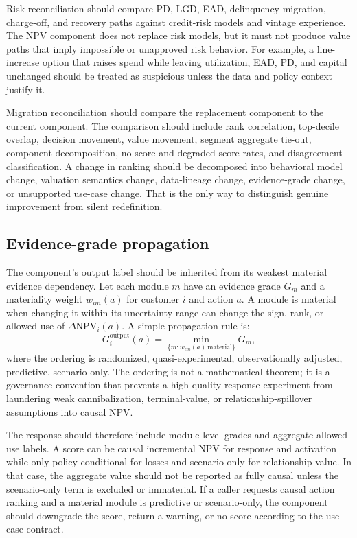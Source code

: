 \documentclass[11pt]{article}
\newcommand{\NPV}{\mathrm{NPV}}
\newcommand{\1}{\mathbf{1}}
\begin{document}
Risk reconciliation should compare PD, LGD, EAD, delinquency migration,
charge-off, and recovery paths against credit-risk models and vintage
experience. The NPV component does not replace risk models, but it must not
produce value paths that imply impossible or unapproved risk behavior. For
example, a line-increase option that raises spend while leaving utilization,
EAD, PD, and capital unchanged should be treated as suspicious unless the data
and policy context justify it.

Migration reconciliation should compare the replacement component to the
current component. The comparison should include rank correlation,
top-decile overlap, decision movement, value movement, segment aggregate
tie-out, component decomposition, no-score and degraded-score rates, and
disagreement classification. A change in ranking should be decomposed into
behavioral model change, valuation semantics change, data-lineage change,
evidence-grade change, or unsupported use-case change. That is the only way
to distinguish genuine improvement from silent redefinition.

\subsection{Evidence-grade propagation}
\label{subsec:evidence-grade-propagation}

The component's output label should be inherited from its weakest material
evidence dependency. Let each module $m$ have an evidence grade $G_m$ and a
materiality weight $w_{im}(a)$ for customer $i$ and action $a$. A module is
material when changing it within its uncertainty range can change the sign,
rank, or allowed use of $\Delta \NPV_i(a)$. A simple propagation rule is:
\begin{equation}
  G^{\mathrm{output}}_i(a)
  =
  \min_{\{m:w_{im}(a)\ \mathrm{material}\}} G_m,
  \label{eq:evidence-grade-propagation}
\end{equation}
where the ordering is randomized, quasi-experimental, observationally
adjusted, predictive, scenario-only. The ordering is not a mathematical
theorem; it is a governance convention that prevents a high-quality response
experiment from laundering weak cannibalization, terminal-value, or
relationship-spillover assumptions into causal NPV.

The response should therefore include module-level grades and aggregate
allowed-use labels. A score can be causal incremental NPV for response and
activation while only policy-conditional for losses and scenario-only for
relationship value. In that case, the aggregate value should not be reported
as fully causal unless the scenario-only term is excluded or immaterial. If a
caller requests causal action ranking and a material module is predictive or
scenario-only, the component should downgrade the score, return a warning, or
no-score according to the use-case contract.
\end{document}
